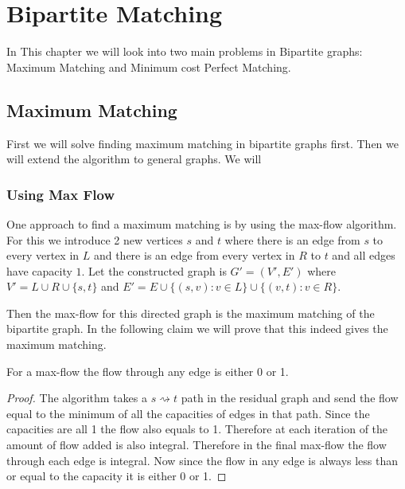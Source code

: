 \chapter{Bipartite Matching}

In This chapter we will look into two main problems in Bipartite graphs: Maximum Matching and Minimum cost Perfect Matching.
\section{Maximum Matching}

\begin{algoprob}
\end{algoprob}

First we will solve finding maximum matching in bipartite graphs first. Then we will extend the algorithm to general graphs. We will

\subsection{Using Max Flow}
One approach to find a maximum matching is by using the max-flow algorithm. For this we introduce 2 new vertices $s$ and $t$ where there is an edge from $s$ to every vertex in $L$ and there is an edge from every vertex in $R$ to $t$ and all edges have capacity $1$. Let the constructed graph is $G'=(V', E')$ where $V'=L\cup R\cup\{s,t\}$ and $E'=E\cup \{(s,v)\colon v\in L\}\cup \{(v,t)\colon v\in R\}$.

Then the max-flow for this directed graph is the maximum matching of the bipartite graph. In the following claim we will prove that this indeed gives the maximum matching. 
\begin{lemma}{}{}
	For a max-flow the flow through any edge is either 0 or 1.
\end{lemma}
\begin{proof}
	The  algorithm takes a $s\rightsquigarrow t$ path in the residual graph and send the flow equal to the minimum of all the capacities of edges in that path. Since the capacities are all 1 the flow also equals to 1. Therefore at each iteration of  the amount of flow added is also integral. Therefore in the final max-flow the flow through each edge is integral. Now since the flow in any edge is always less than or equal to the capacity it is either 0 or 1.
\end{proof}

